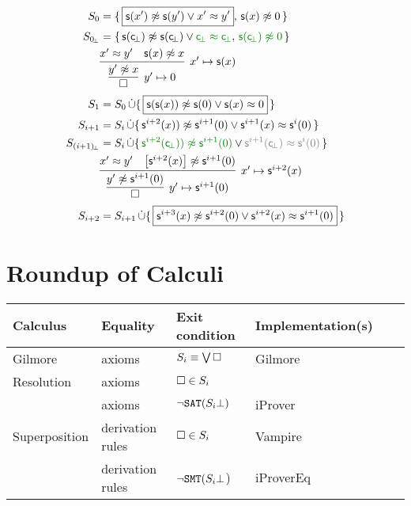 \begin{align*}
S_0 &= \{\, \boxed{\msucc(x') \mNE \msucc (y') \lor x' \mEQ y'}, \, \msucc(x)\mNE 0 \, \}
\\
S_{0\!_\bot} &= \{\, \msucc(\consbot) \mNE \msucc (\consbot) \lor{\colHi\consbot \mEQ \consbot}, \, {\colHi \msucc(\consbot)\mNE 0} \, \}
\\
&\infer[x'\mapsto \msucc(x)
]{
	\infer[y'\mapsto 0]{\emptyclause}{ y'\mNE x }
}
{x' \mEQ y' & \msucc(x)\mNE x}
\\
S_1 &= S_0\disjointunion \{\,
\boxed{\msucc(\msucc(x)) \mNE \msucc(0) \lor \msucc(x) \mEQ 0} \,
\}
\\
S_{i+1} &= S_i\disjointunion \{\,
\msucc^{i+2}(x)) \mNE \msucc^{i+1} (0) \lor \msucc^{i+1}(x) \mEQ \msucc^i(0) \,
\}
\\
S_{(i+1)\!_\bot} &= S_i\disjointunion \{\,
{\colHi \msucc^{i+2}(\consbot)) \mNE \msucc^{i+1} (0)} \lor {\colG\msucc^{i+1}(\consbot) \mEQ \msucc^i(0)} \,
\}
\\
&\infer[x'\mapsto \msucc^{i+2}(x)
]{
	\infer[y'\mapsto \msucc^{i+1}(0)]{\emptyclause}{ y'\mNE \msucc^{i+1}(0) }
}
{x' \mEQ y' & \left[\msucc^{i+2}(x)\right]\mNE \msucc^{i+1}(0)}
\\
S_{i+2} &= S_{i+1}\disjointunion \{\,
\boxed{\msucc^{i+3}(x) \mNE \msucc^{i+2}(0) \lor \msucc^{i+2}(x) \mEQ \msucc^{i+1}(0)} \,
\}
\end{align*}

\section{Roundup of Calculi}

\begin{tabular}{llllll}
	Calculus & Equality & Exit condition & Implementation(s)\\
	\hline
	Gilmore & axioms & \(S_i \equiv \bigvee\square\)  & Gilmore\\
	Resolution & axioms & \(\square\in S_i\)\\
	\InstGen & axioms & \(\lnot\texttt{SAT}(S_i\bot)\) & iProver\\
	Superposition & derivation rules & \(\square\in S_i\) & Vampire \\
	\InstGenEQ & derivation rules & \(\lnot\texttt{SMT}(S_i\bot\)) & iProverEq
\end{tabular}





